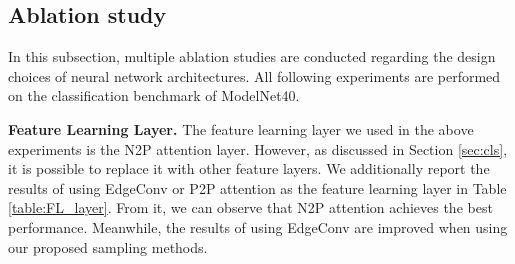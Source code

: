 \documentclass[10pt,twocolumn,letterpaper]{article}
\begin{document}
\begin{table}[t]
\centering
{}
\caption{Ablation study of using different feature learning layers in the classification network.}
\label{table:FL_layer}
\end{table}


\subsection{Ablation study}
\label{sec:ablation}
In this subsection, multiple ablation studies are conducted regarding the design choices of neural network architectures. 
All following experiments are performed on the classification benchmark of ModelNet40.

\textbf{Feature Learning Layer.}
The feature learning layer we used in the above experiments is the N2P attention layer. However, as discussed in Section \ref{sec:cls}, it is possible to replace it with other feature layers. We additionally report the results of using EdgeConv or P2P attention as the feature learning layer in Table \ref{table:FL_layer}. From it, we can observe that N2P attention achieves the best performance. Meanwhile, the results of using EdgeConv are improved when using our proposed sampling methods.


\begin{table}[t]
\centering
{}
\caption{Ablation study of using a different number of embedding dimensions for the classification task. \vspace{-0.2cm}}
\label{table:embedding}
\end{table}
\end{document}
